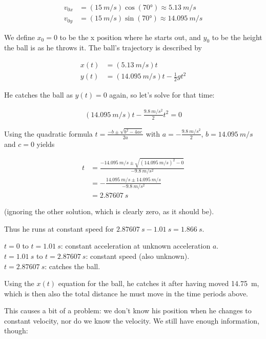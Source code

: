 \documentclass[12pt,a4paper]{report}
\begin{document}
\begin{align}
v_{0x} &= (\SI{15}{m/s}) \cos(\ang{70}) \approx \SI{5.13}{m/s}\\
v_{0y} &= (\SI{15}{m/s}) \sin(\ang{70}) \approx \SI{14.095}{m/s}
\end{align}

We define $x_0 = 0$ to be the x position where he starts out, and $y_0$ to be the height the ball is as he throws it. The ball's trajectory is described by

\begin{align}
x(t) &= (\SI{5.13}{m/s}) t\\
y(t) &= (\SI{14.095}{m/s}) t - \frac{1}{2} g t^2
\end{align}

He catches the ball as $y(t) = 0$ again, so let's solve for that time:

\begin{align}
(\SI{14.095}{m/s}) t - \frac{\SI{9.8}{m/s^2}}{2} t^2 = 0
\end{align}

Using the quadratic formula $t = \frac{-b \pm \sqrt{b^2 - 4ac}}{2a}$ with $a = - \frac{\SI{9.8}{m/s^2}}{2}$, $b = \SI{14.095}{m/s}$ and $c = 0$ yields

\begin{align}
t &= \frac{-\SI{14.095}{m/s} \pm \sqrt{(\SI{14.095}{m/s})^2 - 0}}{-\SI{9.8}{m/s^2}}\\
  &= -\frac{\SI{14.095}{m/s} \pm \SI{14.095}{m/s}}{\SI{-9.8}{m/s^2}}\\
  &= \SI{2.87607}{s}
\end{align}

(ignoring the other solution, which is clearly zero, as it should be).

Thus he runs at constant speed for $\SI{2.87607}{s} - \SI{1.01}{s} = \SI{1.866}{s}$.

$t = 0$ to $t = \SI{1.01}{s}$: constant acceleration at unknown acceleration $a$.\\
$t = \SI{1.01}{s}$ to $t = \SI{2.87607}{s}$: constant speed (also unknown).\\
$t = \SI{2.87607}{s}$: catches the ball.

Using the $x(t)$ equation for the ball, he catches it after having moved \SI{14.75}{m}, which is then also the total distance he must move in the time periods above.

This causes a bit of a problem: we don't know his position when he changes to constant velocity, nor do we know the velocity. We still have enough information, though:
\end{document}
